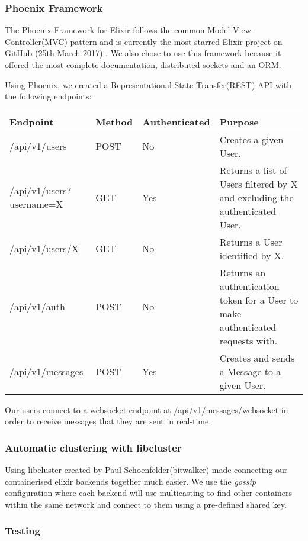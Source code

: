 \documentclass[11pt,a4paper]{report}
\begin{document}
\subsubsection{Phoenix Framework}

The Phoenix Framework for Elixir follows the common Model-View-Controller(MVC) pattern and is currently the most starred Elixir project on GitHub (25th March 2017) \cite{website:github_elixir_trending}. We also chose to use this framework because it offered the most complete documentation, distributed sockets and an ORM.

Using Phoenix, we created a Representational State Transfer(REST) API with the following endpoints:

\begin{center}
\begin{tabular}{ | l | l | l | p{4cm} |}
  \hline
  Endpoint & Method & Authenticated & Purpose \\
  \hline
  /api/v1/users & POST & No & Creates a given User. \\
  \hline
  /api/v1/users?username=X & GET & Yes & Returns a list of Users filtered by X and excluding the authenticated User. \\
  \hline
  /api/v1/users/X & GET & No & Returns a User identified by X. \\
  \hline
  /api/v1/auth & POST & No & Returns an authentication token for a User to make authenticated requests with. \\
  \hline
  /api/v1/messages & POST & Yes & Creates and sends a Message to a given User. \\
  \hline
\end{tabular}
\end{center}

Our users connect to a websocket endpoint at /api/v1/messages/websocket in order to receive messages that they are sent in real-time.

\subsubsection{Automatic clustering with libcluster}

Using libcluster created by Paul Schoenfelder(bitwalker) made connecting our containerised elixir backends together much easier. We use the \textit{gossip} configuration where each backend will use multicasting to find other containers within the same network and connect to them using a pre-defined shared key.

\subsubsection{Testing}
\end{document}
